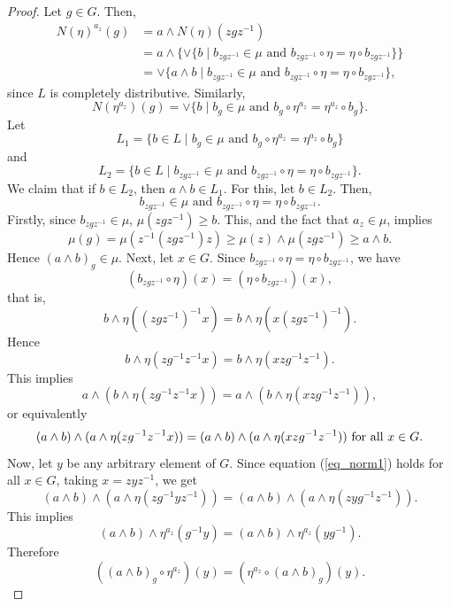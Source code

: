 \documentclass[10pt]{article}
\theoremstyle{plain}
\theoremstyle{definition}
\theoremstyle{remark}
\theoremstyle{case}
\begin{document}
\begin{proof}
	Let $g \in G$. Then, 
	\begin{equation*}
	\begin{split} 
	N(\eta)^{a_z}(g) &= a \wedge N(\eta)(zgz^{-1}) \\
		&= a \wedge \{ \vee \{ b \mid b_{zgz^{-1}} \in \mu \text{ and } b_{zgz^{-1}} \circ \eta = \eta \circ b_{zgz^{-1}} \}\} \\
		&= \vee \{ a \wedge b \mid b_{zgz^{-1}} \in \mu \text{ and } b_{zgz^{-1}} \circ \eta = \eta \circ b_{zgz^{-1}} \},
	\end{split}
	\end{equation*}
	since $L$ is completely distributive. Similarly,
	\[ N(\eta^{a_z})(g) = \vee \{ b \mid b_g \in \mu \text{ and } b_g \circ \eta^{a_z} = \eta^{a_z} \circ b_g \}. \]
	Let 
	\[ L_1 = \{ b \in L \mid b_g \in \mu \text{ and } b_g \circ \eta^{a_z} = \eta^{a_z} \circ b_g \} \]
	and
	\[ L_2 = \{ b \in L \mid b_{zgz^{-1}} \in \mu \text{ and } b_{zgz^{-1}} \circ \eta = \eta \circ b_{zgz^{-1}} \}. \]
	We claim that if  $b \in L_2$, then $a \wedge b \in L_1$. For this, let $b \in L_2$. Then,
	\[ b_{zgz^{-1}} \in \mu \text{ and } b_{zgz^{-1}} \circ \eta = \eta \circ b_{zgz^{-1}}. \]
	Firstly, since $ b_{zgz^{-1}} \in \mu$,	$\mu(zgz^{-1}) \geq b$.	This, and the fact that $a_z \in \mu$, implies 
	\[ \mu(g) = \mu(z^{-1}(zgz^{-1})z) \geq \mu(z) \wedge \mu(zgz^{-1}) \geq a \wedge b. \]
	Hence $(a \wedge b)_g \in \mu$. Next, let $x \in G$. Since	$b_{zgz^{-1}} \circ \eta = \eta \circ b_{zgz^{-1}}$, we have
	\[ (b_{zgz^{-1}} \circ \eta)(x) = (\eta \circ b_{zgz^{-1}})(x), \]
	that is,
	\[ b \wedge \eta((zgz^{-1})^{-1}x) = b \wedge \eta(x(zgz^{-1})^{-1}). \]
	Hence
	\[  b \wedge \eta(zg^{-1}z^{-1}x) = b \wedge \eta(xzg^{-1}z^{-1}). \]
	This implies
	\[ a \wedge (b \wedge \eta(zg^{-1}z^{-1}x)) = a \wedge (b \wedge \eta(xzg^{-1}z^{-1})), \]
	or equivalently
	\begin{equation}{\label{eq_norm1}}
	 (a \wedge b) \wedge (a \wedge \eta(zg^{-1}z^{-1}x)) = (a \wedge b) \wedge (a \wedge \eta(xzg^{-1}z^{-1}))~\text{for all} ~x \in G.
	\end{equation}
	Now, let $y$ be any arbitrary element of $G$. Since equation (\ref{eq_norm1}) holds for all $x \in G$, taking $x = zyz^{-1}$, we get
	\[ (a \wedge b) \wedge (a \wedge \eta(zg^{-1}yz^{-1})) = (a \wedge b) \wedge (a \wedge \eta(zyg^{-1}z^{-1})). \]
	This implies
	\[ (a \wedge b) \wedge \eta^{a_z}(g^{-1}y) = (a \wedge b) \wedge \eta^{a_z}(yg^{-1}). \] 
	Therefore
	\[ ((a \wedge b)_g \circ \eta^{a_z})(y) = (\eta^{a_z} \circ (a \wedge b)_g)(y). \]

\end{proof}
\end{document}
